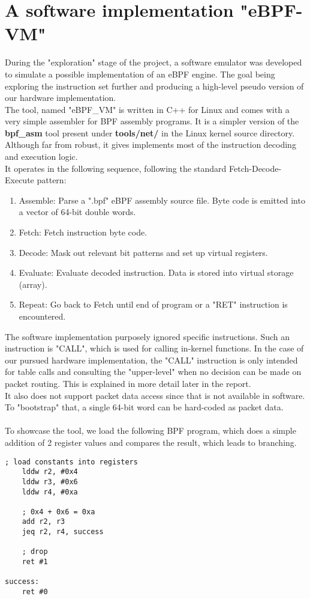 \documentclass{l4proj}
\begin{document}
\section{A software implementation "eBPF-VM"}
During the "exploration" stage of the project, a software emulator was developed to simulate a possible implementation of an eBPF engine. The goal being exploring the instruction set further and producing a high-level pseudo version of our hardware implementation.\\
The tool, named "eBPF\_VM" is written in C++ for Linux and comes with a very simple assembler for BPF assembly programs. It is a simpler version of the \textbf{bpf\_asm} tool present under \textbf{tools/net/} in the Linux kernel source directory. Although far from robust, it gives implements most of the instruction decoding and execution logic.\\It operates in the following sequence, following the standard Fetch-Decode-Execute pattern:
\begin{enumerate}
    \item Assemble: Parse a ".bpf" eBPF assembly source file. Byte code is emitted into a vector of 64-bit double words.
    \item Fetch: Fetch instruction byte code.
    \item Decode: Mask out relevant bit patterns and set up virtual registers.
    \item Evaluate: Evaluate decoded instruction. Data is stored into virtual storage (array).
    \item Repeat: Go back to Fetch until end of program or a "RET" instruction is encountered.
\end{enumerate}
The software implementation purposely ignored specific instructions. Such an instruction is "CALL", which is used for calling in-kernel functions. In the case of our pursued hardware implementation, the "CALL" instruction is only intended for table calls and consulting the "upper-level" when no decision can be made on packet routing. This is explained in more detail later in the report.\\
It also does not support packet data access since that is not available in software. To "bootstrap" that, a single 64-bit word can be hard-coded as packet data.\\\\
To showcase the tool, we load the following BPF program, which does a simple addition of 2 register values and compares the result, which leads to branching.
\begin{lstlisting}[language=ebpfAsm]
    ; load constants into registers
    lddw r2, #0x4
    lddw r3, #0x6
    lddw r4, #0xa
    
    ; 0x4 + 0x6 = 0xa
    add r2, r3
    jeq r2, r4, success
    
    ; drop
    ret #1
    
success:
    ret #0
\end{lstlisting}
\end{document}
